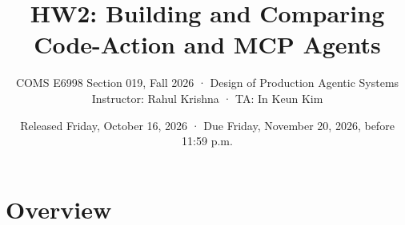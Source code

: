 \documentclass[9pt,letterpaper]{article}
\title{HW2: Building and Comparing Code-Action and MCP Agents}
\author{COMS E6998 Section 019, Fall 2026 · Design of Production Agentic Systems\\
  Instructor: Rahul Krishna · TA: In Keun Kim}
\date{Released Friday, October 16, 2026 · Due Friday, November 20, 2026, before 11:59 p.m.}
\begin{document}
\makeatletter\markeverypar{\the\everypar}\makeatother
\maketitle

\newcommand\code[1]{\texttt{\detokenize{#1}}}
\newcommand\file{\nolinkurl}

\section{Overview}\label{sec:overview}
\end{document}
